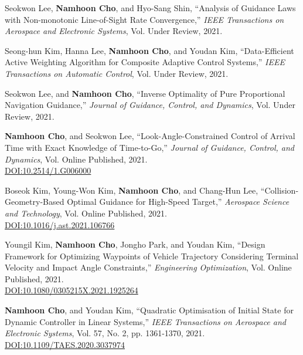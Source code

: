 \begin{enumerate}[itemsep=0.5em, label={[}J\arabic*{]}]
\item Seokwon Lee, \textbf{Namhoon Cho}, and Hyo-Sang Shin, ``Analysis of Guidance Laws with Non-monotonic Line-of-Sight Rate Convergence,'' \textit{IEEE Transactions on Aerospace and Electronic Systems}, Vol. Under Review, 2021. 

\item Seong-hun Kim, Hanna Lee, \textbf{Namhoon Cho}, and Youdan Kim, ``Data-Efficient Active Weighting Algorithm for Composite Adaptive Control Systems,'' \textit{IEEE Transactions on Automatic Control}, Vol. Under Review, 2021. 

\item Seokwon Lee, and \textbf{Namhoon Cho}, ``Inverse Optimality of Pure Proportional Navigation Guidance,'' \textit{Journal of Guidance, Control, and Dynamics}, Vol. Under Review, 2021. 

\item \textbf{Namhoon Cho}, and Seokwon Lee, ``Look-Angle-Constrained Control of Arrival Time with Exact Knowledge of Time-to-Go,'' \textit{Journal of Guidance, Control, and Dynamics}, Vol. Online Published, 2021. \\
 \href{https://doi.org/10.2514/1.G006000}{DOI:10.2514/1.G006000}

\item Boseok Kim, Young-Won Kim, \textbf{Namhoon Cho}, and Chang-Hun Lee, ``Collision-Geometry-Based Optimal Guidance for High-Speed Target,'' \textit{Aerospace Science and Technology}, Vol. Online Published, 2021. \\
 \href{https://doi.org/10.1016/j.ast.2021.106766}{DOI:10.1016/j.ast.2021.106766}

\item Youngil Kim, \textbf{Namhoon Cho}, Jongho Park, and Youdan Kim, ``Design Framework for Optimizing Waypoints of Vehicle Trajectory Considering Terminal Velocity and Impact Angle Constraints,'' \textit{Engineering Optimization}, Vol. Online Published, 2021. \\
 \href{https://doi.org/10.1080/0305215X.2021.1925264}{DOI:10.1080/0305215X.2021.1925264}

\item \textbf{Namhoon Cho}, and Youdan Kim, ``Quadratic Optimisation of Initial State for Dynamic Controller in Linear Systems,'' \textit{IEEE Transactions on Aerospace and Electronic Systems}, Vol. 57, No. 2, pp. 1361-1370, 2021. \\
 \href{https://doi.org/10.1109/TAES.2020.3037974}{DOI:10.1109/TAES.2020.3037974}


\end{enumerate}
